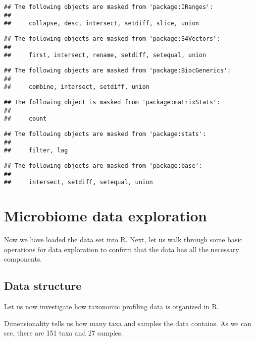 \documentclass[
  oneside]{book}
\begin{document}
\begin{verbatim}
## The following objects are masked from 'package:IRanges':
## 
##     collapse, desc, intersect, setdiff, slice, union
\end{verbatim}

\begin{verbatim}
## The following objects are masked from 'package:S4Vectors':
## 
##     first, intersect, rename, setdiff, setequal, union
\end{verbatim}

\begin{verbatim}
## The following objects are masked from 'package:BiocGenerics':
## 
##     combine, intersect, setdiff, union
\end{verbatim}

\begin{verbatim}
## The following object is masked from 'package:matrixStats':
## 
##     count
\end{verbatim}

\begin{verbatim}
## The following objects are masked from 'package:stats':
## 
##     filter, lag
\end{verbatim}

\begin{verbatim}
## The following objects are masked from 'package:base':
## 
##     intersect, setdiff, setequal, union
\end{verbatim}

\hypertarget{microbiome-data-exploration}{%
\chapter{Microbiome data exploration}\label{microbiome-data-exploration}}

Now we have loaded the data set into R. Next, let us walk through some
basic operations for data exploration to confirm that the data has all
the necessary components.

\hypertarget{data-structure}{%
\section{Data structure}\label{data-structure}}

Let us now investigate how taxonomic profiling data is organized in R.

Dimensionality tells us how many taxa and samples the data
contains. As we can see, there are 151 taxa and 27
samples.
\end{document}
